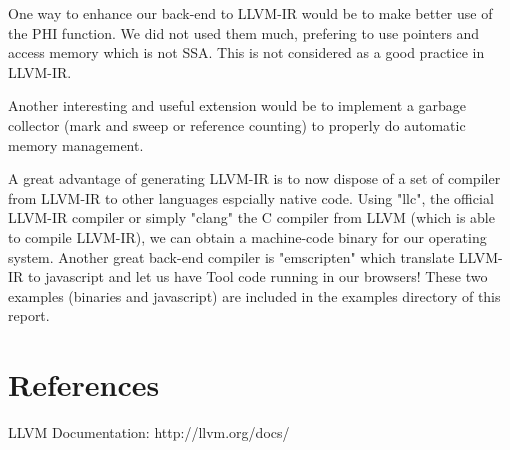 One way to enhance our back-end to LLVM-IR would be to make better use of the PHI function. We did not used them much, prefering to use pointers and access memory which is not SSA. This is not considered as a good practice in LLVM-IR.

Another interesting and useful extension would be to implement a garbage collector (mark and sweep or reference counting) to properly do automatic memory management.

A great advantage of generating LLVM-IR is to now dispose of a set of compiler from LLVM-IR to other languages espcially native code. Using "llc", the official LLVM-IR compiler or simply "clang" the C compiler from LLVM (which is able to compile LLVM-IR), we can obtain a machine-code binary for our operating system. Another great back-end compiler is "emscripten" which translate LLVM-IR to javascript and let us have Tool code running in our browsers! These two examples (binaries and javascript) are included in the examples directory of this report.

\section*{References}
LLVM Documentation: http://llvm.org/docs/